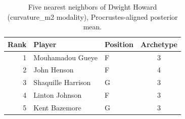 \begin{table}[htbp]
  \centering\small
  \begin{tabular}{rllc}
    \toprule
    Rank & Player & Position & Archetype \\
    \midrule
    1 & Mouhamadou Gueye & F & 3 \\
    2 & John Henson & F & 4 \\
    3 & Shaquille Harrison & G & 3 \\
    4 & Linton Johnson & F & 3 \\
    5 & Kent Bazemore & G & 3 \\
    \bottomrule
  \end{tabular}
  \caption{Five nearest neighbors of Dwight Howard (curvature_m2 modality), Procrustes-aligned posterior mean.}
  \label{tab:Dwight_Howard_neighbors_curvature_m2}
\end{table}


